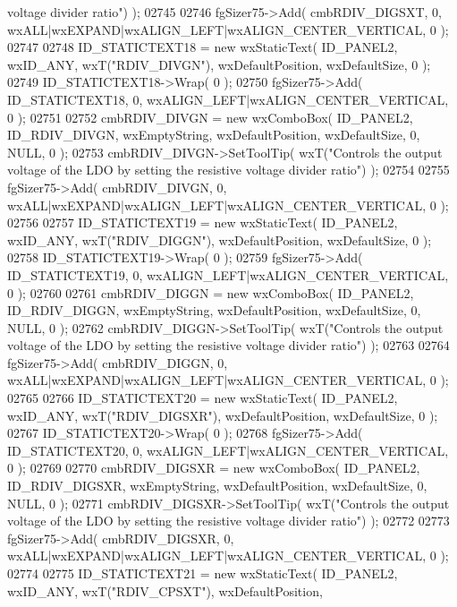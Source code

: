 \begin{DoxyCode}
{       voltage divider ratio"}) );
02745     
02746     fgSizer75->Add( cmbRDIV_DIGSXT, 0, wxALL|wxEXPAND|wxALIGN\_LEFT|wxALIGN\_CENTER\_VERTICAL, 0 );
02747     
02748     ID_STATICTEXT18 = \textcolor{keyword}{new} wxStaticText( ID_PANEL2, wxID\_ANY, wxT(\textcolor{stringliteral}{"RDIV\_DIVGN"}), wxDefaultPosition, 
      wxDefaultSize, 0 );
02749     ID_STATICTEXT18->Wrap( 0 );
02750     fgSizer75->Add( ID_STATICTEXT18, 0, wxALIGN\_LEFT|wxALIGN\_CENTER\_VERTICAL, 0 );
02751     
02752     cmbRDIV_DIVGN = \textcolor{keyword}{new} wxComboBox( ID_PANEL2, ID_RDIV_DIVGN, wxEmptyString, wxDefaultPosition, 
      wxDefaultSize, 0, NULL, 0 ); 
02753     cmbRDIV_DIVGN->SetToolTip( wxT(\textcolor{stringliteral}{"Controls the output voltage of the LDO by setting the resistive voltage
       divider ratio"}) );
02754     
02755     fgSizer75->Add( cmbRDIV_DIVGN, 0, wxALL|wxEXPAND|wxALIGN\_LEFT|wxALIGN\_CENTER\_VERTICAL, 0 );
02756     
02757     ID_STATICTEXT19 = \textcolor{keyword}{new} wxStaticText( ID_PANEL2, wxID\_ANY, wxT(\textcolor{stringliteral}{"RDIV\_DIGGN"}), wxDefaultPosition, 
      wxDefaultSize, 0 );
02758     ID_STATICTEXT19->Wrap( 0 );
02759     fgSizer75->Add( ID_STATICTEXT19, 0, wxALIGN\_LEFT|wxALIGN\_CENTER\_VERTICAL, 0 );
02760     
02761     cmbRDIV_DIGGN = \textcolor{keyword}{new} wxComboBox( ID_PANEL2, ID_RDIV_DIGGN, wxEmptyString, wxDefaultPosition, 
      wxDefaultSize, 0, NULL, 0 ); 
02762     cmbRDIV_DIGGN->SetToolTip( wxT(\textcolor{stringliteral}{"Controls the output voltage of the LDO by setting the resistive voltage
       divider ratio"}) );
02763     
02764     fgSizer75->Add( cmbRDIV_DIGGN, 0, wxALL|wxEXPAND|wxALIGN\_LEFT|wxALIGN\_CENTER\_VERTICAL, 0 );
02765     
02766     ID_STATICTEXT20 = \textcolor{keyword}{new} wxStaticText( ID_PANEL2, wxID\_ANY, wxT(\textcolor{stringliteral}{"RDIV\_DIGSXR"}), wxDefaultPosition, 
      wxDefaultSize, 0 );
02767     ID_STATICTEXT20->Wrap( 0 );
02768     fgSizer75->Add( ID_STATICTEXT20, 0, wxALIGN\_LEFT|wxALIGN\_CENTER\_VERTICAL, 0 );
02769     
02770     cmbRDIV_DIGSXR = \textcolor{keyword}{new} wxComboBox( ID_PANEL2, ID_RDIV_DIGSXR, wxEmptyString, wxDefaultPosition, 
      wxDefaultSize, 0, NULL, 0 ); 
02771     cmbRDIV_DIGSXR->SetToolTip( wxT(\textcolor{stringliteral}{"Controls the output voltage of the LDO by setting the resistive
       voltage divider ratio"}) );
02772     
02773     fgSizer75->Add( cmbRDIV_DIGSXR, 0, wxALL|wxEXPAND|wxALIGN\_LEFT|wxALIGN\_CENTER\_VERTICAL, 0 );
02774     
02775     ID_STATICTEXT21 = \textcolor{keyword}{new} wxStaticText( ID_PANEL2, wxID\_ANY, wxT(\textcolor{stringliteral}{"RDIV\_CPSXT"}), wxDefaultPosition, 

\end{DoxyCode}
